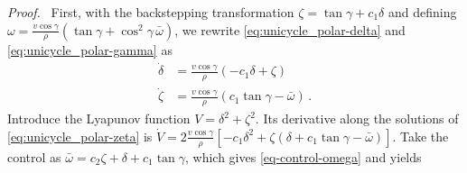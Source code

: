 \documentclass[10pt,a4paper]{amsart}
\renewenvironment{proof}[1][Proof]{\par\pushQED{\qed}\normalfont\textit{#1.}~}{\popQED\par}
\begin{document}
\begin{proof}
First, with the backstepping transformation $\zeta = \tan\gamma + c_1 \delta$ and defining $\omega = \frac{v\cos\gamma}{\rho} \left(\tan\gamma +\cos^2\gamma \, \bar\omega\right)$, we rewrite \eqref{eq:unicycle_polar-delta} and \eqref{eq:unicycle_polar-gamma} as
\begin{subequations}
\label{eq:unicycle_polar-zeta}
\begin{align}
\label{eq:unicycle_polar-delta-zeta}
\dot{\delta} &=  \frac{v\cos\gamma}{\rho} \left(-c_1\delta+\zeta\right) %
\\
\label{eq:unicycle_polar-gamma-zeta}
\dot\zeta &= 
\frac{v\cos\gamma}{\rho}\left(c_1\tan\gamma -\bar\omega\right) \,.
\end{align} 
\end{subequations}
Introduce the Lyapunov function $V = \delta^2 + \zeta^2$. Its derivative along the solutions of \eqref{eq:unicycle_polar-zeta} is $\dot V = 2 \frac{v\cos\gamma}{\rho}\left[
-c_1\delta^2 +\zeta\left(\delta+c_1\tan\gamma - \bar\omega\right)
\right]$.
Take the control as $\bar\omega = 
c_2 \zeta + \delta + c_1\tan \gamma $, which gives \eqref{eq-control-omega} and yields

\end{proof}
\end{document}
